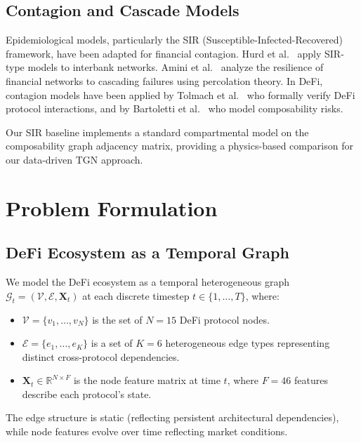\documentclass[journal]{IEEEtran}
\begin{document}
\subsection{Contagion and Cascade Models}

Epidemiological models, particularly the SIR (Susceptible-Infected-Recovered) framework, have been adapted for financial contagion.
Hurd et al.~\cite{hurd2016contagion} apply SIR-type models to interbank networks.
Amini et al.~\cite{amini2016resilience} analyze the resilience of financial networks to cascading failures using percolation theory.
In DeFi, contagion models have been applied by Tolmach et al.~\cite{tolmach2021formal} who formally verify DeFi protocol interactions, and by Bartoletti et al.~\cite{bartoletti2021formal} who model composability risks.

Our SIR baseline implements a standard compartmental model on the composability graph adjacency matrix, providing a physics-based comparison for our data-driven TGN approach.


\section{Problem Formulation}

\subsection{DeFi Ecosystem as a Temporal Graph}

We model the DeFi ecosystem as a temporal heterogeneous graph $\mathcal{G}_t = (\mathcal{V}, \mathcal{E}, \mathbf{X}_t)$ at each discrete timestep $t \in \{1, \ldots, T\}$, where:
\begin{itemize}
    \item $\mathcal{V} = \{v_1, \ldots, v_N\}$ is the set of $N = 15$ DeFi protocol nodes.
    \item $\mathcal{E} = \{e_1, \ldots, e_K\}$ is a set of $K = 6$ heterogeneous edge types representing distinct cross-protocol dependencies.
    \item $\mathbf{X}_t \in \mathbb{R}^{N \times F}$ is the node feature matrix at time $t$, where $F = 46$ features describe each protocol's state.
\end{itemize}

The edge structure is static (reflecting persistent architectural dependencies), while node features evolve over time reflecting market conditions.
\end{document}
